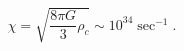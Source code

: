 \begin{equation}
\chi =\sqrt{\frac{8\pi G}3\rho _c}\sim 10^{34}\sec ^{-1}.
\label{ka}
\end{equation}

